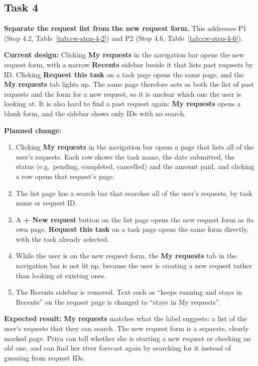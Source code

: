 \documentclass{article}
\begin{document}
\subsection{Task 4}
\label{sec:change-requests}
\textbf{Separate the request list from the new request form.} This addresses P1 (Step 4.2, Table~\ref{tab:cw-step-4-2}) and P2 (Step 4.6, Table~\ref{tab:cw-step-4-6}).

\textbf{Current design:} Clicking \textbf{My requests} in the navigation bar opens the new request form, with a narrow \textbf{Recents} sidebar beside it that lists past requests by ID. Clicking \textbf{Request this task} on a task page opens the same page, and the \textbf{My requests} tab lights up. The same page therefore acts as both the list of past requests and the form for a new request, so it is unclear which one the user is looking at. It is also hard to find a past request again: \textbf{My requests} opens a blank form, and the sidebar shows only IDs with no search.

\textbf{Planned change:}
\begin{enumerate}
    \item Clicking \textbf{My requests} in the navigation bar opens a page that lists all of the user's requests. Each row shows the task name, the date submitted, the status (e.g.\ pending, completed, cancelled) and the amount paid, and clicking a row opens that request's page.
    \item The list page has a search bar that searches all of the user's requests, by task name or request ID.
    \item A \textbf{+ New request} button on the list page opens the new request form as its own page. \textbf{Request this task} on a task page opens the same form directly, with the task already selected.
    \item While the user is on the new request form, the \textbf{My requests} tab in the navigation bar is not lit up, because the user is creating a new request rather than looking at existing ones.
    \item The Recents sidebar is removed. Text such as ``keeps running and stays in Recents'' on the request page is changed to ``stays in My requests''.
\end{enumerate}

\textbf{Expected result:} \textbf{My requests} matches what the label suggests: a list of the user's requests that they can search. The new request form is a separate, clearly marked page. Priya can tell whether she is starting a new request or checking an old one, and can find her river forecast again by searching for it instead of guessing from request IDs.
\end{document}
